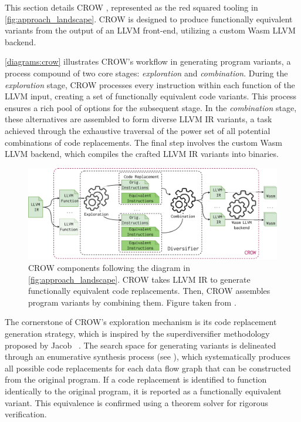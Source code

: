 
\label{section:crow}
\renewcommand{\tool}{CROW\xspace}

This section details CROW \cite{CROW}, represented as the red squared tooling in \autoref{fig:approach_landscape}. 
CROW is designed to produce functionally equivalent \wasm variants from the output of an LLVM front-end, utilizing a custom Wasm LLVM backend.

\autoref{diagrams:crow} illustrates CROW's workflow in generating program variants, a process compound of two core stages: \textit{exploration} and \textit{combination}. 
During the \textit{exploration} stage, CROW processes every instruction within each function of the LLVM input, creating a set of functionally equivalent code variants. 
This process ensures a rich pool of options for the subsequent stage.
In the \textit{combination} stage, these alternatives are assembled to form diverse LLVM IR variants, a task achieved through the exhaustive traversal of the power set of all potential combinations of code replacements. 
The final step involves the custom Wasm LLVM backend, which compiles the crafted LLVM IR variants into \wasm binaries. 


\begin{figure}[h]
    \includegraphics[width=\linewidth]{diagrams/generation/crow.drawio.pdf}
    \caption{CROW components following the diagram in \autoref{fig:approach_landscape}. CROW takes LLVM IR to generate functionally equivalent code replacements. Then, CROW assembles program variants by combining them. Figure taken from \cite{Lic}.}
    \label{diagrams:crow}
\end{figure}



The cornerstone of CROW's exploration mechanism is its code replacement generation strategy, which is inspired by the superdiversifier methodology proposed by Jacob \etal~\cite{jacob2008superdiversifier}. 
The search space for generating variants is delineated through an enumerative synthesis process (see ), which systematically produces all possible code replacements for each data flow graph that can be constructed from the original program. 
If a code replacement is identified to function identically to the original program, it is reported as a functionally equivalent variant.
This equivalence is confirmed using a theorem solver for rigorous verification.

